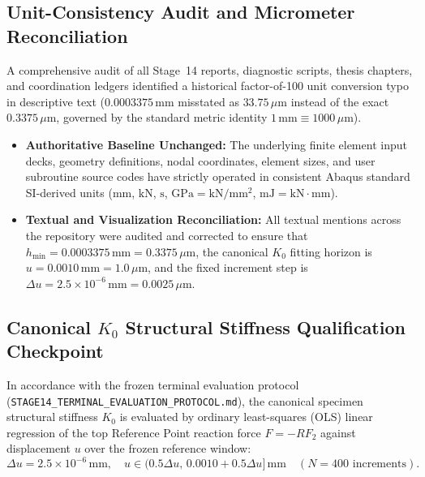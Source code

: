 \subsection{Unit-Consistency Audit and Micrometer Reconciliation}
\label{subsec:unit_consistency}

A comprehensive audit of all Stage~14 reports, diagnostic scripts, thesis chapters, and coordination ledgers identified a historical factor-of-100 unit conversion typo in descriptive text ($0.0003375\,\mathrm{mm}$ misstated as $33.75\,\mu\mathrm{m}$ instead of the exact $0.3375\,\mu\mathrm{m}$, governed by the standard metric identity $1\,\mathrm{mm} \equiv 1000\,\mu\mathrm{m}$).
\begin{itemize}
    \item \textbf{Authoritative Baseline Unchanged:} The underlying finite element input decks, geometry definitions, nodal coordinates, element sizes, and user subroutine source codes have strictly operated in consistent Abaqus standard SI-derived units ($\mathrm{mm}$, $\mathrm{kN}$, $\mathrm{s}$, $\mathrm{GPa} = \mathrm{kN/mm^2}$, $\mathrm{mJ} = \mathrm{kN\cdot mm}$).
    \item \textbf{Textual and Visualization Reconciliation:} All textual mentions across the repository were audited and corrected to ensure that $h_{\min} = 0.0003375\,\mathrm{mm} = 0.3375\,\mu\mathrm{m}$, the canonical $K_0$ fitting horizon is $u = 0.0010\,\mathrm{mm} = 1.0\,\mu\mathrm{m}$, and the fixed increment step is $\Delta u = 2.5\times 10^{-6}\,\mathrm{mm} = 0.0025\,\mu\mathrm{m}$.
\end{itemize}

\subsection{Canonical \texorpdfstring{$K_0$}{K0} Structural Stiffness Qualification Checkpoint}
\label{subsec:canonical_k0_eval}

In accordance with the frozen terminal evaluation protocol (\texttt{STAGE14\_TERMINAL\_EVALUATION\_PROTOCOL.md}), the canonical specimen structural stiffness $K_0$ is evaluated by ordinary least-squares (OLS) linear regression of the top Reference Point reaction force $F = -RF_2$ against displacement $u$ over the frozen reference window:
\begin{equation}
\label{eq:canonical_k0_rule}
\Delta u = 2.5\times 10^{-6}\,\mathrm{mm}, \quad u \in (0.5\Delta u, \, 0.0010 + 0.5\Delta u]\,\mathrm{mm} \quad (N=400\text{ increments}).
\end{equation}

